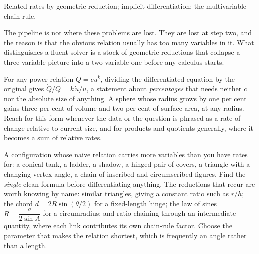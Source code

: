 \begin{seealsob}Related rates by geometric reduction; implicit differentiation; the multivariable chain rule.\end{seealsob}

The pipeline is not where these problems are lost. They are lost at step two, and the reason is that the obvious relation usually has too many variables in it. What distinguishes a fluent solver is a stock of geometric reductions that collapse a three-variable picture into a two-variable one before any calculus starts.

\begin{keynote}
For any power relation $Q=cu^{k}$, dividing the differentiated equation by the original gives $\dot Q/Q=k\,\dot u/u$, a statement about \emph{percentages} that needs neither $c$ nor the absolute size of anything. A sphere whose radius grows by one per cent gains three per cent of volume and two per cent of surface area, at any radius. Reach for this form whenever the data or the question is phrased as a rate of change relative to current size, and for products and quotients generally, where it becomes a sum of relative rates.
\end{keynote}

\cue A configuration whose naive relation carries more variables than you have rates for: a conical tank, a ladder, a shadow, a hinged pair of covers, a triangle with a changing vertex angle, a chain of inscribed and circumscribed figures.
\method Find the \emph{single} clean formula before differentiating anything. The reductions that recur are worth knowing by name: similar triangles, giving a constant ratio such as $r/h$; the chord $d=2R\sin(\theta/2)$ for a fixed-length hinge; the law of sines $R=\dfrac{a}{2\sin A}$ for a circumradius; and ratio chaining through an intermediate quantity, where each link contributes its own chain-rule factor. Choose the parameter that makes the relation shortest, which is frequently an angle rather than a length.

